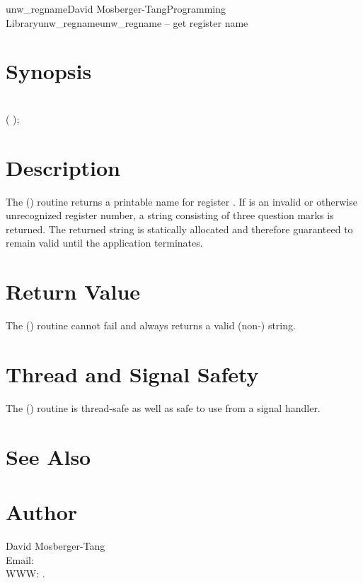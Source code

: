 \documentclass{article}
\begin{document}
\begin{Name}{3}{unw\_regname}{David Mosberger-Tang}{Programming Library}{unw\_regname}unw\_regname -- get register name
\end{Name}

\section{Synopsis}

\\

( );\\

\section{Description}

The () routine returns a printable name for
register .  If  is an invalid or otherwise
unrecognized register number, a string consisting of three question
marks is returned.  The returned string is statically allocated and
therefore guaranteed to remain valid until the application terminates.

\section{Return Value}

The () routine cannot fail and always returns a
valid (non-) string.

\section{Thread and Signal Safety}

The () routine is thread-safe as well as safe to
use from a signal handler.

\section{See Also}


\section{Author}

\noindent
David Mosberger-Tang\\
Email: \\
WWW: .
\LatexManEnd
\end{document}
